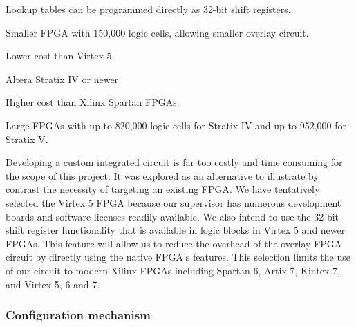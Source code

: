 \begin{enumeration}
\begin{itemlist}
\begin{enumeration}
\begin{itemlist}
					\item Lookup tables can be programmed directly as 32-bit shift registers.
					\item Smaller FPGA with 150,000 logic cells\cite{xilinx-models}, allowing smaller overlay circuit.
					\item Lower cost than Virtex 5.
				\end{itemlist}
			\item Altera Stratix IV or newer
				\begin{itemlist}
					\item Higher cost than Xilinx Spartan FPGAs.
					\item Large FPGAs with up to 820,000 logic cells for Stratix IV\cite{altera-stratix4} and up to 952,000 for Stratix V\cite{altera-stratix5}.
					\item {}
				\end{itemlist}
		\end{enumeration}
	\end{itemlist}
\end{enumeration}

Developing a custom integrated circuit is far too costly and time consuming for the scope of this project.
It was explored as an alternative to illustrate by contrast the necessity of targeting an existing FPGA.
We have tentatively selected the Virtex 5 FPGA because our supervisor has numerous development boards and software licenses readily available.
We also intend to use the 32-bit shift register functionality that is available in logic blocks in Virtex 5 and newer FPGAs.
This feature will allow us to reduce the overhead of the overlay FPGA circuit by directly using the native FPGA's features.
This selection limits the use of our circuit to modern Xilinx FPGAs including Spartan 6, Artix 7, Kintex 7, and Virtex 5, 6 and 7.



\subsubsection{Configuration mechanism}

